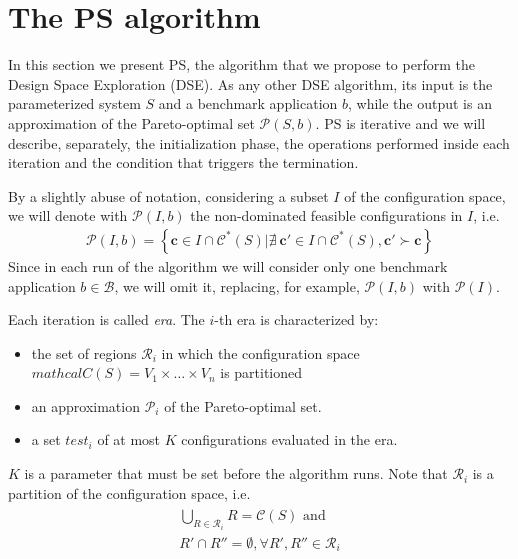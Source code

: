 
\section{The PS algorithm}
\label{sec:algorithm}
In this section we present PS, the algorithm that we propose to perform the Design Space Exploration (DSE). As any other DSE algorithm, its input is the parameterized system $S$ and a benchmark application $b$, while the output is an approximation of the Pareto-optimal set $\mathcal{P}\left(S,b\right)$.   
PS is iterative and we will describe, separately, the initialization phase, the operations performed inside each iteration and the condition that triggers the termination.

By a slightly abuse of notation, considering a subset $I$ of the configuration space, we will denote with $\mathcal{P}(I,b)$ the non-dominated feasible configurations in $I$, i.e.
	\begin{align}
		\mathcal{P}(I,b)=
		\left\{ \mathbf{c} \in I \cap \mathcal{C}^*(S) | \nexists \ \mathbf{c}' \in I \cap \mathcal{C}^*(S), \mathbf{c}' \succ \mathbf{c} \right\}
	\end{align}
Since in each run of the algorithm we will consider only one benchmark application $b\in\mathcal{B}$, we will omit it, replacing, for example, $\mathcal{P}(I,b)$ with  $\mathcal{P}(I)$.

Each iteration is called \emph{era}. The $i$-th era is characterized by: 
	\begin{itemize}
	\item the set of regions $\mathcal{R}_{i}$ in which the configuration space
	$mathcal{C}(S)=V_{1}\times\dots\times V_{n}$ is partitioned
	\item an approximation $\mathscr{P}_{i}$ of the Pareto-optimal set.
	\item a set $test_{i}$ of at most $K$ configurations evaluated
	in the era. 
	\end{itemize}
$K$ is a parameter that must be set before the algorithm runs.
 Note that $\mathcal{R}_{i}$ is a partition of the configuration space, i.e.
	\begin{align}\begin{array}{l}
		\bigcup_{R\in\mathcal{R}_i} R = \mathcal{C}(S) \mbox{ and}\\
		R' \cap R'' = \emptyset, \forall R',R'' \in \mathcal{R}_i
	\end{array}\end{align}

